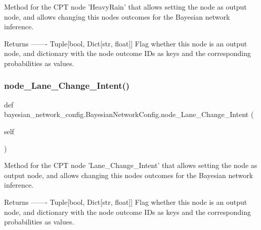 \begin{DoxyVerb}Method for the CPT node 'HeavyRain' that allows setting the node as output node, 
and allows changing this nodes outcomes for the Bayesian network inference.

Returns
-------
Tuple[bool, Dict[str, float]]
    Flag whether this node is an output node, and dictionary with the node outcome IDs as keys 
    and the corresponding probabilities as values.
\end{DoxyVerb}
 \mbox{\label{classbayesian__network__config_1_1_bayesian_network_config_a597ae7d023043c246dc2e31ceb125eec}} 
\subsubsection{\texorpdfstring{node\+\_\+\+Lane\+\_\+\+Change\+\_\+\+Intent()}{node\_Lane\_Change\_Intent()}\hspace{0.1cm}{\footnotesize\ttfamily [1/2]}}
{\footnotesize\ttfamily def bayesian\+\_\+network\+\_\+config.\+Bayesian\+Network\+Config.\+node\+\_\+\+Lane\+\_\+\+Change\+\_\+\+Intent (\begin{DoxyParamCaption}\item[{}]{self }\end{DoxyParamCaption})}

\begin{DoxyVerb}Method for the CPT node 'Lane_Change_Intent' that allows setting the node as output node,
and allows changing this nodes outcomes for the Bayesian network inference.

Returns
-------
Tuple[bool, Dict[str, float]]
    Flag whether this node is an output node, and dictionary with the node outcome IDs as keys
    and the corresponding probabilities as values.
\end{DoxyVerb}
 \mbox{\label{classbayesian__network__config_1_1_bayesian_network_config_a597ae7d023043c246dc2e31ceb125eec}} 
